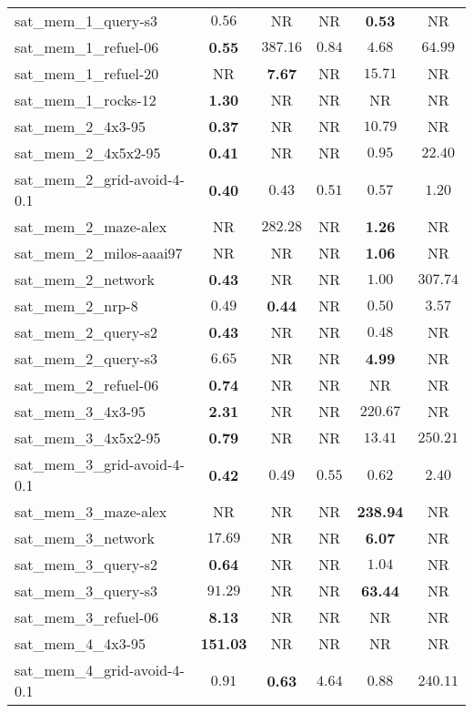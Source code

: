 \begin{tabular}{lccccc}
sat\_mem\_1\_query-s3 & $0.56$ & NR & NR & \textbf{0.53} & NR \\
sat\_mem\_1\_refuel-06 & \textbf{0.55} & $387.16$ & $0.84$ & $4.68$ & $64.99$ \\
sat\_mem\_1\_refuel-20 & NR & \textbf{7.67} & NR & $15.71$ & NR \\
sat\_mem\_1\_rocks-12 & \textbf{1.30} & NR & NR & NR & NR \\
sat\_mem\_2\_4x3-95 & \textbf{0.37} & NR & NR & $10.79$ & NR \\
sat\_mem\_2\_4x5x2-95 & \textbf{0.41} & NR & NR & $0.95$ & $22.40$ \\
sat\_mem\_2\_grid-avoid-4-0.1 & \textbf{0.40} & $0.43$ & $0.51$ & $0.57$ & $1.20$ \\
sat\_mem\_2\_maze-alex & NR & $282.28$ & NR & \textbf{1.26} & NR \\
sat\_mem\_2\_milos-aaai97 & NR & NR & NR & \textbf{1.06} & NR \\
sat\_mem\_2\_network & \textbf{0.43} & NR & NR & $1.00$ & $307.74$ \\
sat\_mem\_2\_nrp-8 & $0.49$ & \textbf{0.44} & NR & $0.50$ & $3.57$ \\
sat\_mem\_2\_query-s2 & \textbf{0.43} & NR & NR & $0.48$ & NR \\
sat\_mem\_2\_query-s3 & $6.65$ & NR & NR & \textbf{4.99} & NR \\
sat\_mem\_2\_refuel-06 & \textbf{0.74} & NR & NR & NR & NR \\
sat\_mem\_3\_4x3-95 & \textbf{2.31} & NR & NR & $220.67$ & NR \\
sat\_mem\_3\_4x5x2-95 & \textbf{0.79} & NR & NR & $13.41$ & $250.21$ \\
sat\_mem\_3\_grid-avoid-4-0.1 & \textbf{0.42} & $0.49$ & $0.55$ & $0.62$ & $2.40$ \\
sat\_mem\_3\_maze-alex & NR & NR & NR & \textbf{238.94} & NR \\
sat\_mem\_3\_network & $17.69$ & NR & NR & \textbf{6.07} & NR \\
sat\_mem\_3\_query-s2 & \textbf{0.64} & NR & NR & $1.04$ & NR \\
sat\_mem\_3\_query-s3 & $91.29$ & NR & NR & \textbf{63.44} & NR \\
sat\_mem\_3\_refuel-06 & \textbf{8.13} & NR & NR & NR & NR \\
sat\_mem\_4\_4x3-95 & \textbf{151.03} & NR & NR & NR & NR \\
sat\_mem\_4\_grid-avoid-4-0.1 & $0.91$ & \textbf{0.63} & $4.64$ & $0.88$ & $240.11$ \\

\end{tabular}
